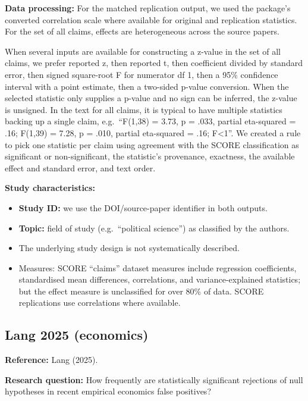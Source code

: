 \documentclass[
  11pt,
]{article}
\providecommand{\tightlist}{%
  \setlength{\itemsep}{0pt}\setlength{\parskip}{0pt}}
\begin{document}
\textbf{Data processing:} For the matched replication output, we used
the package's converted correlation scale where available for original
and replication statistics. For the set of all claims, effects are
heterogeneous across the source papers.

When several inputs are available for constructing a z-value in the set
of all claims, we prefer reported z, then reported t, then coefficient
divided by standard error, then signed square-root F for numerator df 1,
then a 95\% confidence interval with a point estimate, then a two-sided
p-value conversion. When the selected statistic only supplies a p-value
and no sign can be inferred, the z-value is unsigned. In the text for
all claims, it is typical to have multiple statistics backing up a
single claim, e.g.~``F(1,38) = 3.73, p = .033, partial eta-squared =
.16; F(1,39) = 7.28, p = .010, partial eta-squared = .16; F\textless1''.
We created a rule to pick one statistic per claim using agreement with
the SCORE classification as significant or non-significant, the
statistic's provenance, exactness, the available effect and standard
error, and text order.

\textbf{Study characteristics:}

\begin{itemize}
\tightlist
\item
  \textbf{Study ID:} we use the DOI/source-paper identifier in both
  outputs.
\item
  \textbf{Topic:} field of study (e.g.~``political science'') as
  classified by the authors.
\item
  The underlying study design is not systematically described.
\item
  Measures: SCORE ``claims'' dataset measures include regression
  coefficients, standardised mean differences, correlations, and
  variance-explained statistics; but the effect measure is unclassified
  for over 80\% of data. SCORE replications use correlations where
  available.
\end{itemize}

\newpage

\subsection{Lang 2025 (economics)}\label{lang-2025-economics}

\textbf{Reference:} Lang (2025).

\textbf{Research question:} How frequently are statistically significant
rejections of null hypotheses in recent empirical economics false
positives?
\end{document}
